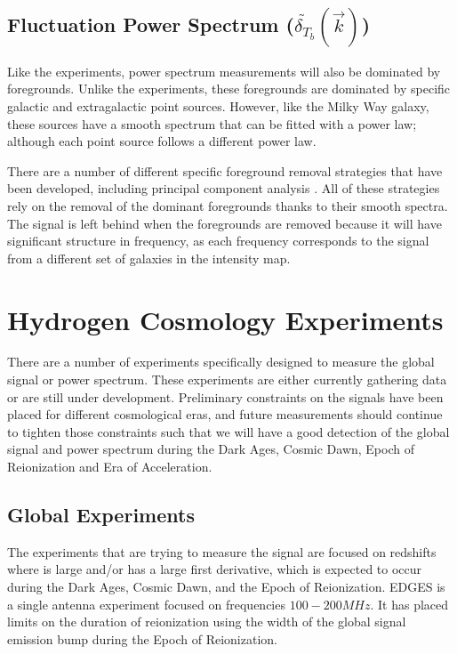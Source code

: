 \subsection{Fluctuation Power Spectrum ($ \tilde{ \delta_{T_b} } ( \vec{k} )$)}
Like the \avgdtb experiments, power spectrum measurements will also be dominated by foregrounds. Unlike the \avgdtb experiments, these foregrounds are dominated by specific galactic and extragalactic point sources. However, like the Milky Way galaxy, these sources have a smooth spectrum that can be fitted with a power law; although each point source follows a different power law. 

There are a number of different specific foreground removal strategies that have been developed, including principal component analysis \cite{masui_2012}\cite{switzer_2013}. All of these strategies rely on the removal of the dominant foregrounds thanks to their smooth spectra. The \cm signal is left behind when the foregrounds are removed because it will have significant structure in frequency, as each frequency corresponds to  the signal from a different set of galaxies in the intensity map. 

\section{Hydrogen \cm Cosmology Experiments} \label{Sec:cm_expts}
There are a number of experiments specifically designed to measure the \cm global signal or power spectrum. These experiments are either currently gathering data or are still under development. Preliminary constraints on the \cm signals have been placed for different cosmological eras, and future measurements should continue to tighten those constraints such that we will have a good detection of the \cm global signal and power spectrum during the Dark Ages, Cosmic Dawn, Epoch of Reionization and Era of Acceleration. 

\subsection{Global Experiments}
The experiments that are trying to measure the \avgdtb signal are focused on redshifts where \dtb is large and/or has a large first derivative, which is expected to occur during the Dark Ages, Cosmic Dawn, and the Epoch of Reionization. EDGES \cite{bowman_2008} is a single antenna experiment focused on frequencies $100-200 MHz$. It has placed limits on the duration of reionization using the width of the \cm global signal emission bump during the Epoch of Reionization. 

